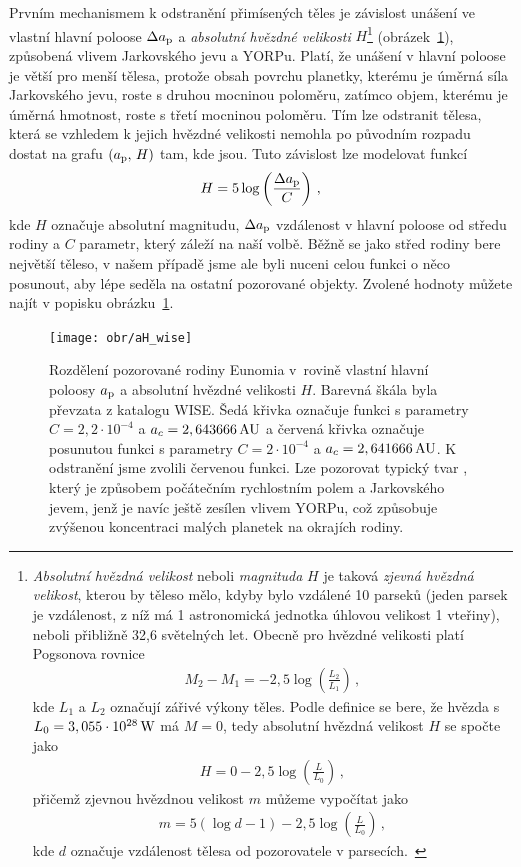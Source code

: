 \documentclass[A4paper, 12pt, oneside]{book}
\begin{document}
Prvním mechanismem k odstranění přimísených těles je závislost unášení ve vlastní hlavní poloose $\Delta a_{\rm p}$ a \textit{absolutní hvězdné velikosti} $H$\footnote{\textit{Absolutní hvězdná velikost} neboli \textit{magnituda} $H$ je taková \textit{zjevná hvězdná velikost}, kterou by těleso mělo, kdyby bylo vzdálené 10 parseků (jeden parsek je vzdálenost, z níž má 1 astronomická jednotka úhlovou velikost 1 vteřiny), neboli přibližně 32,6 světelných let. Obecně pro hvězdné velikosti platí Pogsonova rovnice
\begin{align*}
	M_2-M_1=-2,5\log\left(\frac{L_2}{L_1}\right)\,,
\end{align*}
kde $L_1$ a $L_2$ označují zářivé výkony těles. Podle definice se bere, že hvězda s $L_0=3,055\cdot10^{28}\,{\rm W}$ má $M=0$, tedy absolutní hvězdná velikost $H$ se spočte jako
\begin{align*}
	H=0-2,5\log\left(\frac{L}{L_0}\right)\,,
\end{align*}
přičemž zjevnou hvězdnou velikost $m$ můžeme vypočítat jako
\begin{align*}
	m=5(\log d -1)-2,5\log\left(\frac{L}{L_0}\right)\,,
\end{align*}
kde $d$ označuje vzdálenost tělesa od pozorovatele v parsecích.~\cite{fmt}} 
(obrázek~\ref{fig:aH_wise}), způsobená vlivem Jarkovského jevu a YORPu. Platí, že unášení v hlavní poloose je větší pro menší tělesa, protože obsah povrchu planetky, kterému je úměrná síla Jarkovského jevu, roste s druhou mocninou poloměru, zatímco objem, kterému je úměrná hmotnost, roste s třetí mocninou poloměru. Tím lze odstranit tělesa, která se vzhledem k jejich hvězdné velikosti nemohla po původním rozpadu dostat na grafu $(a_{\rm p},\,H)$ tam, kde jsou. Tuto závislost lze modelovat funkcí 
\begin{align}
	H=5\log\left(\frac{\Delta a_{\rm p}}{C}\right)\,,
\end{align}
kde $H$ označuje absolutní magnitudu, $\Delta a_{\rm p}$ vzdálenost v hlavní poloose od středu rodiny a $C$ parametr, který záleží na naší volbě. Běžně se jako střed rodiny bere největší těleso, v našem případě jsme ale byli nuceni celou funkci o něco posunout, aby lépe seděla na ostatní pozorované objekty. Zvolené hodnoty můžete najít v popisku obrázku~\ref{fig:aH_wise}.
\begin{figure}
	\centering
	\texttt{[image: obr/aH\_wise]}
	\caption{Rozdělení pozorované rodiny Eunomia v~rovině vlastní hlavní poloosy $a_{\rm p}$ a absolutní hvězdné velikosti $H$. Barevná škála byla převzata z katalogu WISE. Šedá křivka označuje funkci s parametry ${C=2,2\cdot10^{-4}}$ a ${a_c=2,643666\,{\rm AU}}$ a červená křivka označuje posunutou funkci s parametry ${C=2\cdot10^{-4}}$ a ${a_c=2,641666\,{\rm AU}}$. K odstranění  jsme zvolili červenou funkci. Lze pozorovat typický tvar , který je způsobem počátečním rychlostním polem a Jarkovského jevem, jenž je navíc ještě zesílen vlivem YORPu, což způsobuje zvýšenou koncentraci malých planetek na okrajích rodiny.}
	\label{fig:aH_wise}
\end{figure}
\end{document}
